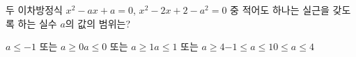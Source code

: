 두 이차방정식 $x^2-ax+a=0$, $x^2-2x+2-a^2=0$ 중 적어도 하나는 실근을 갖도록 하는 실수 $a$의 값의 범위는?
\begin{choicesii}{$a\le -1$ 또는 $a\ge 0$}{$a\le 0$ 또는 $a\ge 1$}{$a\le 1$ 또는 $a\ge 4$}{$-1\le a\le 1$}{$0\le a\le 4$}\end{choicesii}
